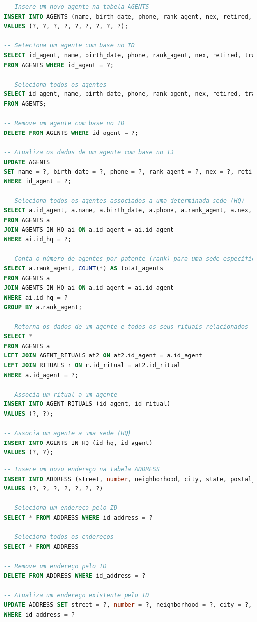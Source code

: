 \documentclass[12pt,a4paper]{report}
\begin{document}
\begin{lstlisting}[language=SQL, caption=Consultas feitas em AgentDAO]
-- Insere um novo agente na tabela AGENTS
INSERT INTO AGENTS (name, birth_date, phone, rank_agent, nex, retired, transcended, specialization, id_agent) 
VALUES (?, ?, ?, ?, ?, ?, ?, ?, ?);

-- Seleciona um agente com base no ID
SELECT id_agent, name, birth_date, phone, rank_agent, nex, retired, transcended, specialization 
FROM AGENTS WHERE id_agent = ?;

-- Seleciona todos os agentes
SELECT id_agent, name, birth_date, phone, rank_agent, nex, retired, transcended, specialization 
FROM AGENTS;

-- Remove um agente com base no ID
DELETE FROM AGENTS WHERE id_agent = ?;

-- Atualiza os dados de um agente com base no ID
UPDATE AGENTS 
SET name = ?, birth_date = ?, phone = ?, rank_agent = ?, nex = ?, retired = ?, transcended = ?, specialization = ? 
WHERE id_agent = ?;

-- Seleciona todos os agentes associados a uma determinada sede (HQ)
SELECT a.id_agent, a.name, a.birth_date, a.phone, a.rank_agent, a.nex, a.retired, a.transcended, a.specialization
FROM AGENTS a
JOIN AGENTS_IN_HQ ai ON a.id_agent = ai.id_agent
WHERE ai.id_hq = ?;

-- Conta o número de agentes por patente (rank) para uma sede específica
SELECT a.rank_agent, COUNT(*) AS total_agents
FROM AGENTS a
JOIN AGENTS_IN_HQ ai ON a.id_agent = ai.id_agent
WHERE ai.id_hq = ?
GROUP BY a.rank_agent;

-- Retorna os dados de um agente e todos os seus rituais relacionados
SELECT *
FROM AGENTS a
LEFT JOIN AGENT_RITUALS at2 ON at2.id_agent = a.id_agent
LEFT JOIN RITUALS r ON r.id_ritual = at2.id_ritual
WHERE a.id_agent = ?;

-- Associa um ritual a um agente
INSERT INTO AGENT_RITUALS (id_agent, id_ritual) 
VALUES (?, ?);

-- Associa um agente a uma sede (HQ)
INSERT INTO AGENTS_IN_HQ (id_hq, id_agent) 
VALUES (?, ?);
\end{lstlisting}

\begin{lstlisting}[language=SQL, caption=Consultas feitas em AddressDAO]
-- Insere um novo endereço na tabela ADDRESS
INSERT INTO ADDRESS (street, number, neighborhood, city, state, postal_code, id_address) 
VALUES (?, ?, ?, ?, ?, ?, ?)

-- Seleciona um endereço pelo ID
SELECT * FROM ADDRESS WHERE id_address = ?

-- Seleciona todos os endereços
SELECT * FROM ADDRESS

-- Remove um endereço pelo ID
DELETE FROM ADDRESS WHERE id_address = ?

-- Atualiza um endereço existente pelo ID
UPDATE ADDRESS SET street = ?, number = ?, neighborhood = ?, city = ?, state = ?, postal_code = ? 
WHERE id_address = ?
\end{lstlisting}
\end{document}
